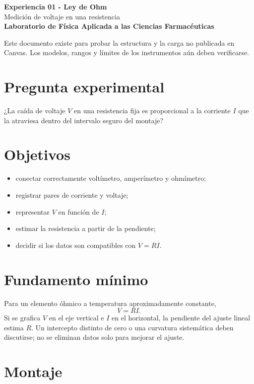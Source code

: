\documentclass[11pt,letterpaper]{article}
\begin{document}
{\color{azul}\Large\bfseries Experiencia 01 - Ley de Ohm}\\[2pt]
{\large Medición de voltaje en una resistencia}\\[8pt]
\textbf{Laboratorio de Física Aplicada a las Ciencias Farmacéuticas}

\begin{aviso}
Este documento existe para probar la estructura y la carga no publicada en
Canvas. Los modelos, rangos y límites de los instrumentos aún deben verificarse.
\end{aviso}

\section*{Pregunta experimental}

¿La caída de voltaje \(V\) en una resistencia fija es proporcional a la
corriente \(I\) que la atraviesa dentro del intervalo seguro del montaje?

\section*{Objetivos}

\begin{itemize}
  \item conectar correctamente voltímetro, amperímetro y ohmímetro;
  \item registrar pares de corriente y voltaje;
  \item representar \(V\) en función de \(I\);
  \item estimar la resistencia a partir de la pendiente;
  \item decidir si los datos son compatibles con \(V=RI\).
\end{itemize}

\section*{Fundamento mínimo}

Para un elemento óhmico a temperatura aproximadamente constante,
\[
  V=RI.
\]
Si se grafica \(V\) en el eje vertical e \(I\) en el horizontal, la pendiente
del ajuste lineal estima \(R\). Un intercepto distinto de cero o una curvatura
sistemática deben discutirse; no se eliminan datos solo para mejorar el ajuste.

\section*{Montaje}
\end{document}
